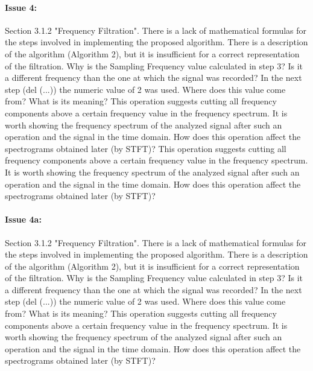 \documentclass{article}
\begin{document}
\paragraph{Issue 4:}
\begin{displayquote}
Section 3.1.2 "Frequency Filtration". There is a lack of mathematical formulas for the steps involved in implementing the proposed algorithm. There is a description of the algorithm (Algorithm 2), but it is insufficient for a correct representation of the filtration. Why is the Sampling Frequency  value calculated in step 3? Is it a different frequency than the one at which the signal was recorded? In the next step (del (...)) the numeric value of 2 was used. Where does this value come from? What is its meaning? This operation suggests cutting all frequency components above a certain frequency value in the frequency spectrum. It is worth showing the frequency spectrum of the analyzed signal after such an operation and the signal in the time domain. How does this operation affect the spectrograms obtained later (by STFT)? This operation suggests cutting all frequency components above a certain frequency value in the frequency spectrum. It is worth showing the frequency spectrum of the analyzed signal after such an operation and the signal in the time domain. How does this operation affect the spectrograms obtained later (by STFT)?
\end{displayquote}

\paragraph{Issue 4a:}
\begin{displayquote}
Section 3.1.2 "Frequency Filtration". There is a lack of mathematical formulas for the steps involved in implementing the proposed algorithm. There is a description of the algorithm (Algorithm 2), but it is insufficient for a correct representation of the filtration. Why is the Sampling Frequency  value calculated in step 3? Is it a different frequency than the one at which the signal was recorded? In the next step (del (...)) the numeric value of 2 was used. Where does this value come from? What is its meaning? This operation suggests cutting all frequency components above a certain frequency value in the frequency spectrum. It is worth showing the frequency spectrum of the analyzed signal after such an operation and the signal in the time domain. How does this operation affect the spectrograms obtained later (by STFT)?
\end{displayquote}
\end{document}
